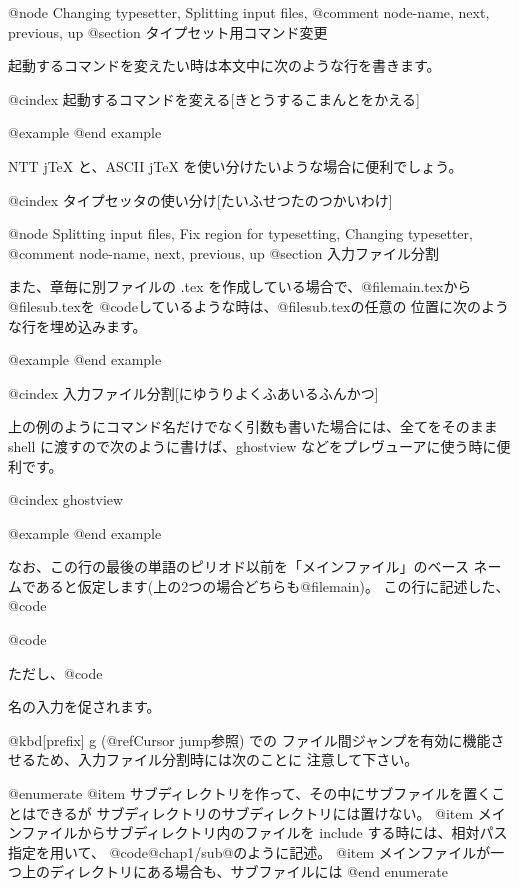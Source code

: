 {{{@node Changing typesetter, Splitting input files, %
@comment  node-name,  next,  previous,  up
@section タイプセット用コマンド変更

  起動するコマンドを変えたい時は本文中に次のような行を書きます。

@cindex 起動するコマンドを変える[きとうするこまんとをかえる]

@example
@end example

NTT jTeX と、ASCII jTeX を使い分けたいような場合に便利でしょう。

@cindex タイプセッタの使い分け[たいふせつたのつかいわけ]

@node Splitting input files, Fix region for typesetting, Changing typesetter, %
@comment  node-name,  next,  previous,  up
@section 入力ファイル分割

また、章毎に別ファイルの .tex を作成している場合で、@file{main.tex}から 
@file{sub.tex}を @code{}しているような時は、@file{sub.tex}の任意の
位置に次のような行を埋め込みます。

@example
@end example

@cindex 入力ファイル分割[にゆうりよくふあいるふんかつ]

上の例のようにコマンド名だけでなく引数も書いた場合には、全てをそのまま 
shell に渡すので次のように書けば、ghostview などをプレヴューアに使う時に便
利です。

@cindex ghostview

@example
@end example

なお、この行の最後の単語のピリオド以前を「メインファイル」のベース
ネームであると仮定します(上の2つの場合どちらも@file{main})。
この行に記述した、@code{%
@code{%
ただし、@code{%
名の入力を促されます。

  @kbd{[prefix] g} (@ref{Cursor jump}参照) での
ファイル間ジャンプを有効に機能させるため、入力ファイル分割時には次のことに
注意して下さい。

@enumerate
@item
サブディレクトリを作って、その中にサブファイルを置くことはできるが
サブディレクトリのサブディレクトリには置けない。
@item
メインファイルからサブディレクトリ内のファイルを include
する時には、相対パス指定を用いて、
@code{@{chap1/sub@}}のように記述。
@item
メインファイルが一つ上のディレクトリにある場合も、サブファイルには
@end enumerate



}}}}}}
